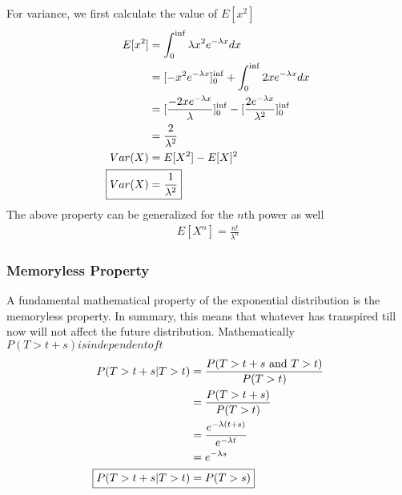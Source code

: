 \documentclass[../../probability-notes.tex]{subfiles}
\begin{document}
    For variance, we first calculate the value of $E[x^{2}]$
    \begin{align*}
        E[x^{2}] &= \int_{0}^{\inf} \lambda x^{2} e^{-\lambda x} dx\\
        &= [-x^{2} e^{-\lambda x}]_{0}^{\inf} + \int_{0}^{\inf} 2x e^{-\lambda x} dx\\
        &= [\frac{-2x e^{-\lambda x}}{\lambda}]_{0}^{\inf} - [\frac{2e^{-\lambda x}}{\lambda^{2}}]_{0}^{\inf}\\
        &= \frac{2}{\lambda^{2}}\\
        Var(X) &= E[X^{2}] - E[X]^{2}\\
        \Aboxed{Var(X) &= \frac{1}{\lambda^{2}}}
    \end{align*}
    The above property can be generalized for the $n$th power as well
    \begin{align*}
        E[X^{n}] = \frac{n!}{\lambda^{n}}
    \end{align*}

    \subsubsection{Memoryless Property}
    A fundamental mathematical property of the exponential distribution is the memoryless property. In summary, this means that whatever has transpired till now will not affect the future distribution. Mathematically $P(T > t+s) is independent of t$
    \begin{align*}
        P(T > t+s | T>t) &= \frac{P(T> t+s \text{ and }T > t)}{P(T > t)}\\
        &= \frac{P(T > t + s)}{P(T > t)}\\
        &= \frac{e^{-\lambda(t+s)}}{e^{-\lambda t}}\\
        &= e^{-\lambda s}\\
        \Aboxed{P(T > t+s | T>t) &= P(T > s)}
    \end{align*}
\end{document}
